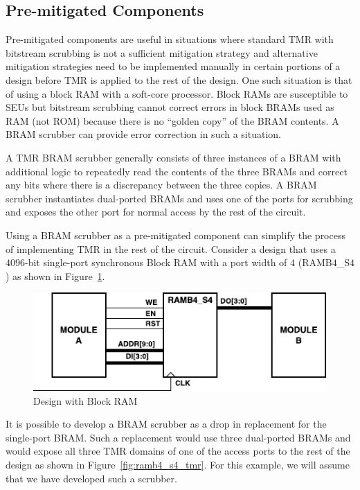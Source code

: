 \subsection{Pre-mitigated Components}
Pre-mitigated components are useful in situations where standard TMR with
bitstream scrubbing is not a sufficient mitigation strategy and alternative
mitigation strategies need to be implemented manually in certain portions of a
design before TMR is applied to the rest of the design. One such situation is
that of using a block RAM with a soft-core processor. Block RAMs are susceptible
to SEUs but bitstream scrubbing cannot correct errors in block BRAMs used as
RAM (not ROM) because there is no ``golden copy'' of the BRAM contents. A BRAM
scrubber can provide error correction in such a situation.

A TMR BRAM scrubber generally consists of three instances of a BRAM with
additional logic to repeatedly read the contents of the three BRAMs and correct
any bits where there is a discrepancy between the three copies. A BRAM scrubber
instantiates dual-ported BRAMs and uses one of the ports for scrubbing and
exposes the other port for normal access by the rest of the circuit.

Using a BRAM scrubber as a pre-mitigated component can simplify the process of
implementing TMR in the rest of the circuit. Consider a design that uses a
$4096$-bit single-port synchronous Block RAM with a port width of $4$
(RAMB$4$\_S$4$) as shown in Figure~\ref{fig:ramb4_s4}.

\begin{figure}[htb]
\begin{center}
\includegraphics[scale=1]{ramb4_s4.pdf}
\caption{Design with Block RAM}
\label{fig:ramb4_s4}
\end{center}
\end{figure}

It is possible to develop a BRAM scrubber as a drop in replacement for the
single-port BRAM. Such a replacement would use three dual-ported BRAMs and
would expose all three TMR domains of one of the access ports to the rest of
the design as shown in Figure~\ref{fig:ramb4_s4_tmr}. For this example, we will
assume that we have developed such a scrubber.

